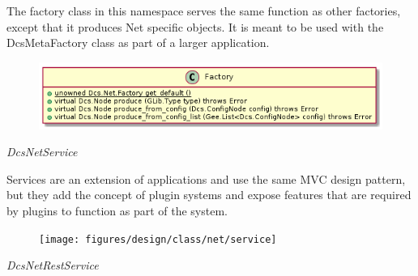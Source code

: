       \vspace*{-0.75cm}
      \begin{minipage}[t]{0.5\textwidth}
      	\vspace*{0.5cm}
        The factory class in this namespace serves the same function as other
        factories, except that it produces Net specific objects. It is meant to
        be used with the DcsMetaFactory class as part of a larger application.
      \end{minipage} \hfill
      \begin{minipage}[t]{0.45\textwidth}
        \begin{figure}[H]
          \includegraphics[width=\textwidth]{figures/design/class/net/factory}
          \label{fig:dsg-classes-net-factory}
        \end{figure}
      \end{minipage}

      \emph{DcsNetService}

      \vspace*{-0.75cm}
      \begin{minipage}[t]{0.5\textwidth}
      	\vspace*{0.5cm}
        Services are an extension of applications and use the same MVC design
        pattern, but they add the concept of plugin systems and expose features
        that are required by plugins to function as part of the system.
      \end{minipage} \hfill
      \begin{minipage}[t]{0.45\textwidth}
        \begin{figure}[H]
          \texttt{[image: figures/design/class/net/service]}
          \label{fig:dsg-classes-net-service}
        \end{figure}
      \end{minipage}

      \emph{DcsNetRestService}

